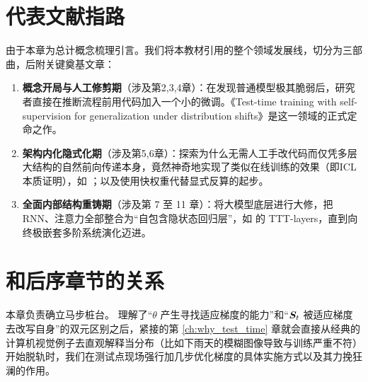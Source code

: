 \section{代表文献指路}
\label{sec:intro_papers}

由于本章为总计概念梳理引言。我们将本教材引用的整个领域发展线，切分为三部曲，后附关键奠基文章：
\begin{enumerate}
    \item \textbf{概念开局与人工修剪期}（涉及第2,3,4章）：在发现普通模型极其脆弱后，研究者直接在推断流程前用代码加入一个小的微调。\citet{sun2020ttt}《Test-time training with self-supervision for generalization under distribution shifts》是这一领域的正式定命之作。
    \item \textbf{架构内化隐式化期}（涉及第5,6章）：探索为什么无需人工手改代码而仅凭多层大结构的自然前向传递本身，竟然神奇地实现了类似在线训练的效果（即ICL本质证明），如 \citet{oswald2022transformers}；以及使用快权重代替显式反算的起步。
    \item \textbf{全面内部结构重铸期}（涉及第 7 至 11 章）：将大模型底层进行大修，把 RNN、注意力全部整合为“自包含隐状态回归层”，如 \citet{sun2024ttt} 的 TTT-layers，直到向终极嵌套多阶系统演化迈进。
\end{enumerate}

\section{和后序章节的关系}
\label{sec:intro_bridges}

本章负责确立马步桩台。
理解了“$\theta$ 产生寻找适应梯度的能力”和“$\boldsymbol{S}_t$ 被适应梯度去改写自身”的双元区别之后，紧接的第 \ref{ch:why_test_time} 章就会直接从经典的计算机视觉例子去直观解释当分布（比如下雨天的模糊图像导致与训练严重不符）开始脱轨时，我们在测试点现场强行加几步优化梯度的具体实施方式以及其力挽狂澜的作用。

